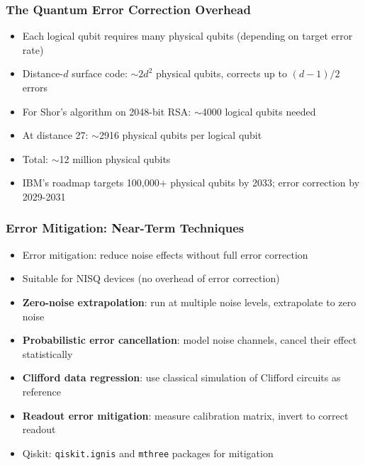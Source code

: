 \begin{frame}[fragile]\frametitle{The Quantum Error Correction Overhead}
\begin{itemize}
\item Each logical qubit requires many physical qubits (depending on target error rate)
\item Distance-$d$ surface code: $\sim 2d^2$ physical qubits, corrects up to $(d-1)/2$ errors
\item For Shor's algorithm on 2048-bit RSA: $\sim$4000 logical qubits needed
\item At distance 27: $\sim$2916 physical qubits per logical qubit
\item Total: $\sim$12 million physical qubits
\item IBM's roadmap targets 100,000+ physical qubits by 2033; error correction by 2029-2031
\end{itemize}
\end{frame}

\begin{frame}[fragile]\frametitle{Error Mitigation: Near-Term Techniques}
\begin{itemize}
\item Error mitigation: reduce noise effects without full error correction
\item Suitable for NISQ devices (no overhead of error correction)
\item \textbf{Zero-noise extrapolation}: run at multiple noise levels, extrapolate to zero noise
\item \textbf{Probabilistic error cancellation}: model noise channels, cancel their effect statistically
\item \textbf{Clifford data regression}: use classical simulation of Clifford circuits as reference
\item \textbf{Readout error mitigation}: measure calibration matrix, invert to correct readout
\item Qiskit: \texttt{qiskit.ignis} and \texttt{mthree} packages for mitigation
\end{itemize}
\end{frame}

